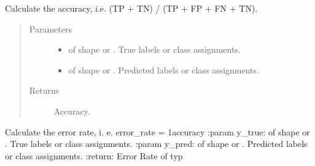 \documentclass[letterpaper,10pt,english]{sphinxmanual}
\begin{document}
\begin{fulllineitems}
\label{\detokenize{pusion.evaluation.evaluation_metrics:pusion.evaluation.evaluation_metrics.accuracy}}
\sphinxAtStartPar
Calculate the accuracy, i.e. (TP + TN) / (TP + FP + FN + TN).
\begin{quote}\begin{description}
\item[{Parameters}] \leavevmode\begin{itemize}
\item {} 
\sphinxAtStartPar
{} \textendash{}  of shape  or . True labels or class assignments.

\item {} 
\sphinxAtStartPar
{} \textendash{}  of shape  or . Predicted labels or
class assignments.

\end{itemize}

\item[{Returns}] \leavevmode
\sphinxAtStartPar
Accuracy.

\end{description}\end{quote}

\end{fulllineitems}


\begin{fulllineitems}
\label{\detokenize{pusion.evaluation.evaluation_metrics:pusion.evaluation.evaluation_metrics.error_rate}}
\sphinxAtStartPar
Calculate the error rate, i. e. error\_rate = 1\sphinxhyphen{}accuracy
:param y\_true:  of shape  or . True labels or class assignments.
:param y\_pred:  of shape  or . Predicted labels or class assignments.
:return: Error Rate of typ 

\end{fulllineitems}
\end{document}

